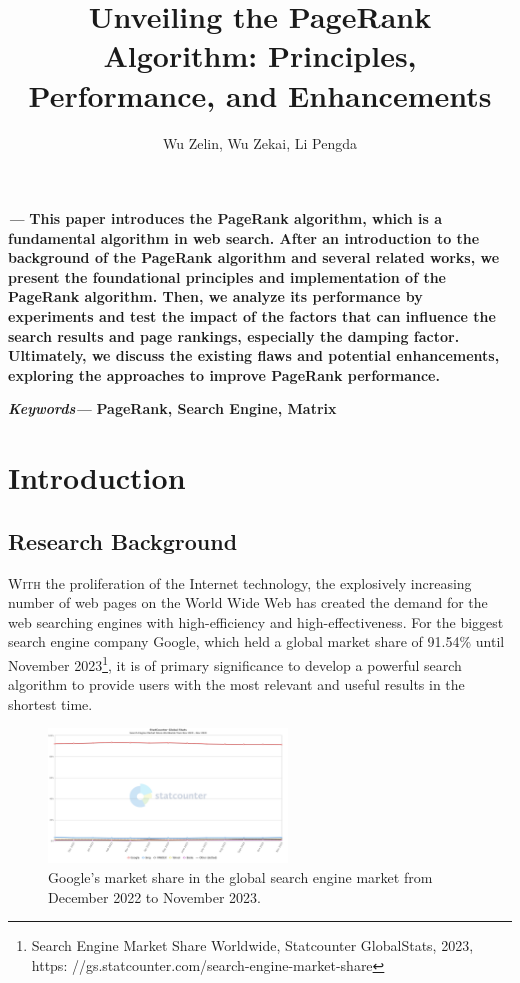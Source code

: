 \documentclass[lettersize,journal,12pt,conference]{IEEEtran}
\renewenvironment{abstract}
{\fontsize{12}{14}\textit{\textbf{\abstractname---}}\bfseries\ignorespaces}
{}
\renewenvironment{IEEEkeywords}
{\fontsize{12}{14}\textit{\textbf{Keywords---}}\bfseries\ignorespaces}{}
\begin{document}
\onehalfspacing
\title{Unveiling the PageRank Algorithm: Principles, Performance, and Enhancements}
\author{Wu Zelin, Wu Zekai, Li Pengda}

\maketitle\thispagestyle{fancy}
%

\begin{abstract}
	This paper introduces the PageRank algorithm, which is a fundamental algorithm in web search. After an introduction to the background of the PageRank algorithm and several related works, we present the foundational principles and implementation of the PageRank algorithm. Then, we analyze its performance by experiments and test the impact of the factors that can influence the search results and page rankings, especially the damping factor. Ultimately, we discuss the existing flaws and potential enhancements, exploring the approaches to improve PageRank performance.
\end{abstract}

\begin{IEEEkeywords}
	PageRank, Search Engine, Matrix
\end{IEEEkeywords}


\section{Introduction}

\subsection{Research Background}

\lettrine{W}{ith}
the proliferation of the Internet technology, the explosively increasing number of web pages on the World Wide Web has created the demand for the web searching engines with high-efficiency and high-effectiveness.
For the biggest search engine company Google, which held a global market share of 91.54\% until November 2023\footnote[1]{Search Engine Market Share Worldwide, Statcounter GlobalStats, 2023, https:
	//gs.statcounter.com/search-engine-market-share}, it is of primary significance to develop a powerful search algorithm to provide users with the most relevant and useful results in the shortest time.

\begin{figure}[h]
	\centering
	\includegraphics[width=2.5in]{images/fig2.png}
	\caption{Google's market share in the global search engine market from December 2022 to November 2023.}
	\label{fig1}
\end{figure}
\end{document}
